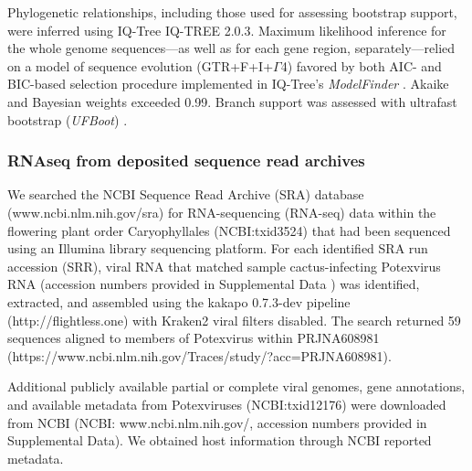 \documentclass[fleqn,10pt,lineno]{wlpeerj}
\begin{document}
Phylogenetic relationships, including those used for assessing bootstrap support, were inferred using IQ-Tree IQ-TREE 2.0.3. 
Maximum likelihood inference for the whole genome sequences---as well as for each gene region, separately---relied on a model of sequence evolution (GTR+F+I+$\Gamma$4) favored by both AIC- and BIC-based selection procedure implemented in IQ-Tree's {\em ModelFinder} \citep{kalyaanamoorthy2017}. Akaike and Bayesian weights exceeded 0.99. 
Branch support was assessed with ultrafast bootstrap ({\em UFBoot}) \citep{hoang2018}.



\subsubsection*{RNAseq from deposited sequence read archives}

We searched the NCBI Sequence Read Archive (SRA) database (www.ncbi.nlm.nih.gov/sra) for RNA-sequencing (RNA-seq) data within the flowering plant order Caryophyllales (NCBI:txid3524) that had been sequenced using an Illumina library sequencing platform. 
For each identified SRA run accession (SRR), viral RNA that matched sample cactus-infecting Potexvirus RNA (accession numbers provided in Supplemental Data ) was identified, extracted, and assembled using the kakapo 0.7.3-dev pipeline (http://flightless.one) with Kraken2 viral filters disabled. 
The search returned 59 sequences aligned to members of Potexvirus within PRJNA608981 (https://www.ncbi.nlm.nih.gov/Traces/study/?acc=PRJNA608981).

Additional publicly available partial or complete viral genomes, gene annotations, and available metadata from Potexviruses (NCBI:txid12176) were downloaded from NCBI (NCBI: www.ncbi.nlm.nih.gov/, accession numbers provided in Supplemental Data).
We obtained host information through NCBI reported metadata.
\end{document}
